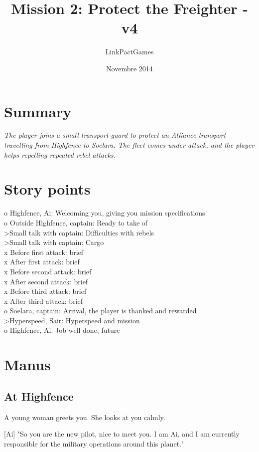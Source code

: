 \documentclass[a4paper,12pt]{article}
\begin{document}
\title{Mission 2: Protect the Freighter - v4}
\author{LinkPactGames}
\date{Novembre 2014}
\maketitle

\section{Summary}
\textit{The player joins a small transport-guard to protect an Alliance
transport travelling from Highfence to Soelara. The fleet comes under attack,
and the player helps repelling repeated rebel attacks.}

\section{Story points}
o Highfence, Ai: Welcoming you, giving you mission specifications\\
o Outside Highfence, captain: Ready to take of\\
\textgreater Small talk with captain: Difficulties with rebels\\
\textgreater Small talk with captain: Cargo\\
x Before first attack: brief\\
x After first attack: brief\\
x Before second attack: brief\\
x After second attack: brief\\
x Before third attack: brief\\
x After third attack: brief\\
o Soelara, captain: Arrival, the player is thanked and rewarded\\
\textgreater Hyperspeed, Sair: Hyperspeed and mission\\
o Highfence, Ai: Job well done, future

\section{Manus}

\subsection{At Highfence}

A young woman greets you. She looks at you calmly. 

[Ai] "So you are the new pilot, nice to meet you. I am Ai, and I am currently
responsible for the military operations around this planet."
\end{document}
